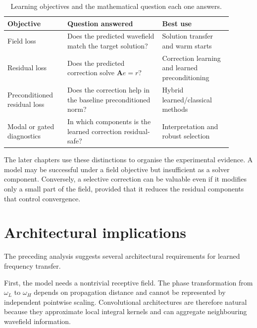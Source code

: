 \begin{table}[htbp]
    \centering
    \caption{Learning objectives and the mathematical question each one
    answers.}
    \label{tab:ch5-objectives}
    \begin{tabular}{@{}p{0.24\linewidth}p{0.38\linewidth}p{0.28\linewidth}@{}}
        \toprule
        Objective & Question answered & Best use \\
        \midrule
        Field loss
        & Does the predicted wavefield match the target solution?
        & Solution transfer and warm starts \\
        Residual loss
        & Does the predicted correction solve $\mathbf{A}e=r$?
        & Correction learning and learned preconditioning \\
        Preconditioned residual loss
        & Does the correction help in the baseline preconditioned norm?
        & Hybrid learned/classical methods \\
        Modal or gated diagnostics
        & In which components is the learned correction residual-safe?
        & Interpretation and robust selection \\
        \bottomrule
    \end{tabular}
\end{table}

The later chapters use these distinctions to organise the experimental
evidence. A model may be successful under a field objective but insufficient
as a solver component. Conversely, a selective correction can be valuable even
if it modifies only a small part of the field, provided that it reduces the
residual components that control convergence.

\section{Architectural implications}
\label{sec:ch5-architecture}

The preceding analysis suggests several architectural requirements for learned
frequency transfer.

First, the model needs a nontrivial receptive field. The phase transformation
from $\omega_L$ to $\omega_H$ depends on propagation distance and cannot be
represented by independent pointwise scaling. Convolutional architectures are
therefore natural because they approximate local integral kernels and can
aggregate neighbouring wavefield information.

